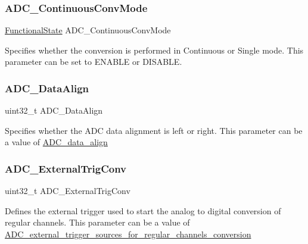 \subsubsection{\texorpdfstring{ADC\_ContinuousConvMode}{ADC\_ContinuousConvMode}}
{\footnotesize\ttfamily \mbox{\hyperlink{group___exported__types_gac9a7e9a35d2513ec15c3b537aaa4fba1}{Functional\+State}} A\+D\+C\+\_\+\+Continuous\+Conv\+Mode}

Specifies whether the conversion is performed in Continuous or Single mode. This parameter can be set to E\+N\+A\+B\+LE or D\+I\+S\+A\+B\+LE. \mbox{\label{struct_a_d_c___init_type_def_a360ec5c7f6e5e1de535ec50dfc2c7e9b}} 
\subsubsection{\texorpdfstring{ADC\_DataAlign}{ADC\_DataAlign}}
{\footnotesize\ttfamily uint32\+\_\+t A\+D\+C\+\_\+\+Data\+Align}

Specifies whether the A\+DC data alignment is left or right. This parameter can be a value of \mbox{\hyperlink{group___a_d_c__data__align}{A\+D\+C\+\_\+data\+\_\+align}} \mbox{\label{struct_a_d_c___init_type_def_a2a0142b756e9b3e30f858f4666f12c36}} 
\subsubsection{\texorpdfstring{ADC\_ExternalTrigConv}{ADC\_ExternalTrigConv}}
{\footnotesize\ttfamily uint32\+\_\+t A\+D\+C\+\_\+\+External\+Trig\+Conv}

Defines the external trigger used to start the analog to digital conversion of regular channels. This parameter can be a value of \mbox{\hyperlink{group___a_d_c__external__trigger__sources__for__regular__channels__conversion}{A\+D\+C\+\_\+external\+\_\+trigger\+\_\+sources\+\_\+for\+\_\+regular\+\_\+channels\+\_\+conversion}} \mbox{\label{struct_a_d_c___init_type_def_a7876bb5e90dfb86b6d3125f00dbc1c62}} 
